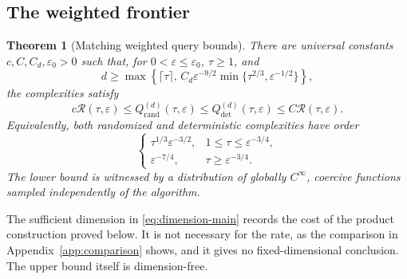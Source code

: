 \documentclass[11pt]{article}
\newtheorem{theorem}{Theorem}[section]
\theoremstyle{definition}
\theoremstyle{remark}
\newcommand{\eps}{\varepsilon}
\newcommand{\Qrand}{Q_{\mathrm{rand}}}
\newcommand{\Qdet}{Q_{\mathrm{det}}}
\newcommand{\Rate}{\mathcal R}
\begin{document}
\begin{samepage}
\subsection{The weighted frontier}
\begin{theorem}[Matching weighted query bounds]\label{thm:main}
There are universal constants $c,C,C_d,\eps_0>0$ such that, for
$0<\eps\le\eps_0$, $\tau\ge1$, and
\begin{equation}\label{eq:dimension-main}
 d\ge
 \max\!\left\{
   \lceil\tau\rceil,\,
   C_d\eps^{-9/2}\min\{\tau^{2/3},\eps^{-1/2}\}
 \right\},
\end{equation}
the complexities satisfy
\begin{equation}\label{eq:main}
 c\Rate(\tau,\eps)
 \le \Qrand^{(d)}(\tau,\eps)
 \le \Qdet^{(d)}(\tau,\eps)
 \le C\Rate(\tau,\eps).
\end{equation}
Equivalently, both randomized and deterministic complexities have order
\begin{equation}\label{eq:two-regimes}
 \begin{cases}
  \tau^{1/3}\eps^{-3/2},&1\le\tau\le\eps^{-3/4},\\[0.15em]
  \eps^{-7/4},&\tau\ge\eps^{-3/4}.
 \end{cases}
\end{equation}
The lower bound is witnessed by a distribution of globally $C^\infty$,
coercive functions sampled independently of the algorithm.
\end{theorem}
\end{samepage}

The sufficient dimension in \eqref{eq:dimension-main} records the cost of
the product construction proved below. It is not necessary for the rate,
as the comparison in Appendix~\ref{app:comparison} shows, and it gives no
fixed-dimensional conclusion. The upper bound itself is dimension-free.
\end{document}
